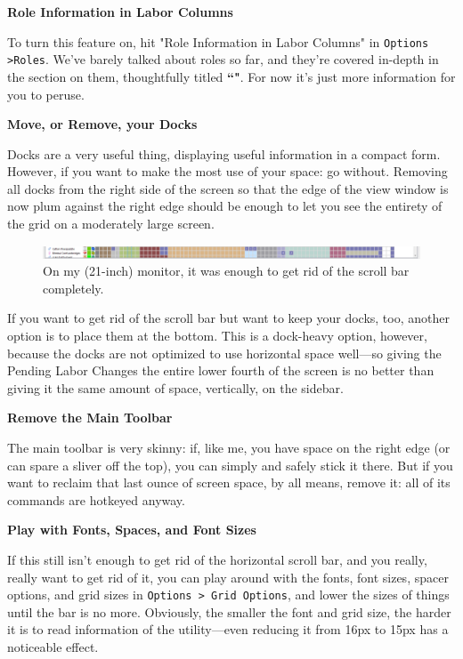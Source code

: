 \documentclass[]{article}
\begin{document}
\noindent \textbf{Role Information in Labor Columns}

To turn this feature on, hit "Role Information in Labor Columns" in \texttt{Options >Roles}. We've barely
talked about roles so far, and they're covered in-depth in the section on them, thoughtfully titled
\textbf{``"}. For now it's just more information for you to peruse.\
\vspace{12pt}

\noindent \textbf{Move, or Remove, your Docks}

Docks are a very useful thing, displaying useful information in a compact form. However, if you want to
make the most use of your space: go without. Removing all docks from the right side of the screen so that
the edge of the view window is now plum against the right edge should be enough to let you see the
entirety of the grid on a moderately large screen.
\begin{figure}[h!] \centering
\vspace{-5pt}
\includegraphics[width=\linewidth]{Sec2Fig26}
\caption{On my (21-inch) monitor, it was enough to get rid of the scroll bar completely.}
\vspace{-5pt}
\end{figure}

If you want to get rid of the scroll bar but want to keep your docks, too, another option is to place
them at the bottom. This is a dock-heavy option, however, because the docks are not optimized to use
horizontal space well---so giving the Pending Labor Changes the entire lower fourth of the screen is no
better than giving it the same amount of space, vertically, on the sidebar.
\vspace{12pt}

\noindent \textbf{Remove the Main Toolbar}

The main toolbar is very skinny: if, like me, you have space on the right edge (or can spare a sliver
off the top), you can simply and safely stick it there. But if you want to reclaim that last ounce of
screen space, by all means, remove it: all of its commands are hotkeyed anyway.
\vspace{12pt}

\noindent \textbf{Play with Fonts, Spaces, and Font Sizes}

If this still isn't enough to get rid of the horizontal scroll bar, and you really, really want to get
rid of it, you can play around with the fonts, font sizes, spacer options, and grid sizes in
\texttt{Options > Grid Options}, and lower the sizes of things until the bar is no more. Obviously, the
smaller the font and grid size, the harder it is to read information of the utility---even reducing it
from 16px to 15px has a noticeable effect.
\vspace{12pt}
\end{document}

